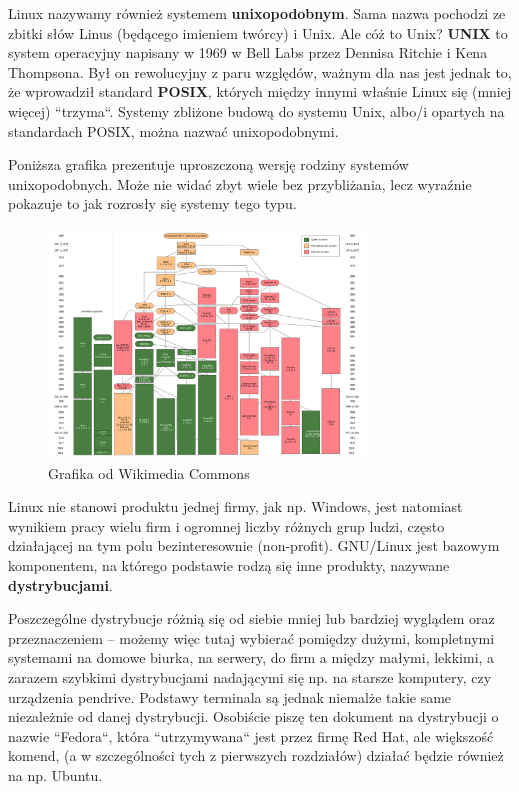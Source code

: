 \documentclass[12pt]{article}
\begin{document}
Linux nazywamy również systemem \textbf{unixopodobnym}. Sama nazwa pochodzi ze zbitki słów Linus (będącego imieniem twórcy) i Unix. Ale cóż to Unix? \textbf{UNIX} to system operacyjny napisany w 1969 w Bell Labs przez Dennisa Ritchie i Kena Thompsona. Był on rewolucyjny z paru względów, ważnym dla nas jest jednak to, że wprowadził standard \textbf{POSIX}, których między innymi właśnie Linux się (mniej więcej) ``trzyma``. Systemy zbliżone budową do systemu Unix, albo/i opartych na standardach POSIX, można nazwać unixopodobnymi.

Poniższa grafika prezentuje uproszczoną wersję rodziny systemów unixopodobnych. Może nie widać zbyt wiele bez przybliżania, lecz wyraźnie pokazuje to jak rozrosły się systemy tego typu.

\begin{figure}[H]
    \centering
    \includegraphics[width=0.75\textwidth]{Unix_history-simple.svg.png}
    \caption{Grafika od Wikimedia Commons}
\end{figure}

Linux nie stanowi produktu jednej firmy, jak np. Windows, jest natomiast wynikiem pracy wielu firm i ogromnej liczby różnych grup ludzi, często działającej na tym polu bezinteresownie (non-profit). GNU/Linux jest bazowym komponentem, na którego podstawie rodzą się inne produkty, nazywane \textbf{dystrybucjami}.

Poszczególne dystrybucje różnią się od siebie mniej lub bardziej wyglądem oraz przeznaczeniem -- możemy więc tutaj wybierać pomiędzy dużymi, kompletnymi systemami na domowe biurka, na serwery, do firm a między małymi, lekkimi, a zarazem szybkimi dystrybucjami nadającymi się np. na starsze komputery, czy urządzenia pendrive. Podstawy terminala są jednak niemalże takie same niezależnie od danej dystrybucji. Osobiście piszę ten dokument na dystrybucji o nazwie ``Fedora``, która ``utrzymywana`` jest przez firmę Red Hat, ale większość komend, (a w szczególności tych z pierwszych rozdziałów) działać będzie również na np. Ubuntu.
\end{document}
